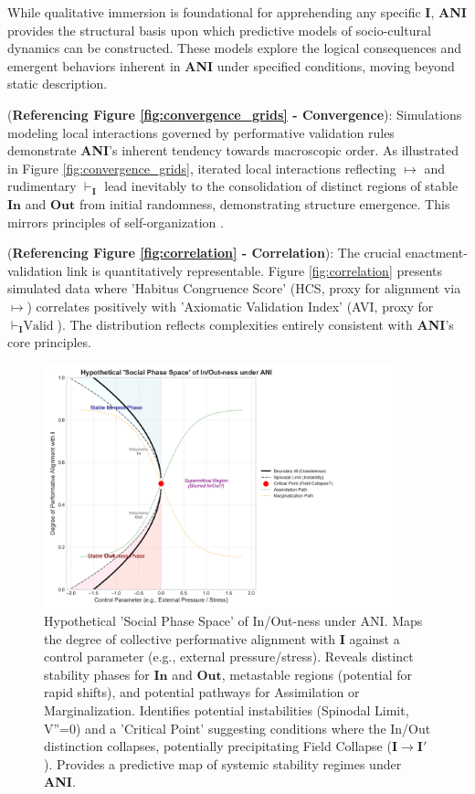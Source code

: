 \documentclass{article}
\newcommand{\ANI}{\textbf{ANI}}             %
\newcommand{\Isness}{\mathbf{I}}            %
\newcommand{\Inness}{\mathbf{In}}           %
\newcommand{\Outness}{\mathbf{Out}}         %
\newcommand{\enactment}{\ensuremath{\mapsto}} %
\newcommand{\validates}[1]{\ensuremath{\vdash_{#1}}} %
\begin{document}
While qualitative immersion \citep{DenzinLincoln2011} is foundational for apprehending any specific $\Isness$, \ANI{} provides the structural basis upon which predictive models of socio-cultural dynamics can be constructed. These models explore the logical consequences and emergent behaviors inherent in \ANI{} under specified conditions, moving beyond static description.

(\textbf{Referencing Figure \ref{fig:convergence_grids} - Convergence}): Simulations modeling local interactions governed by performative validation rules demonstrate \ANI{}'s inherent tendency towards macroscopic order. As illustrated in Figure \ref{fig:convergence_grids}, iterated local interactions reflecting $\enactment$ and rudimentary $\validates{\Isness}$ lead inevitably to the consolidation of distinct regions of stable $\Inness$ and $\Outness$ from initial randomness, demonstrating structure emergence. This mirrors principles of self-organization \citep{Prigogine1984}.

(\textbf{Referencing Figure \ref{fig:correlation} - Correlation}): The crucial enactment-validation link is quantitatively representable. Figure \ref{fig:correlation} presents simulated data where 'Habitus Congruence Score' (HCS, proxy for alignment via $\enactment$) correlates positively with 'Axiomatic Validation Index' (AVI, proxy for $\validates{\Isness} \text{Valid}$). The distribution reflects complexities entirely consistent with \ANI{}'s core principles.

\begin{figure}[h!]
    \centering
    \includegraphics[width=0.9\textwidth]{figures/ani_figure2_phase_inspired.png}
    \caption{Hypothetical 'Social Phase Space' of In/Out-ness under ANI. Maps the degree of collective performative alignment with $\Isness$ against a control parameter (e.g., external pressure/stress). Reveals distinct stability phases for $\Inness$ and $\Outness$, metastable regions (potential for rapid shifts), and potential pathways for Assimilation or Marginalization. Identifies potential instabilities (Spinodal Limit, V''=0) and a 'Critical Point' suggesting conditions where the In/Out distinction collapses, potentially precipitating Field Collapse ($\Isness \rightarrow \Isness'$). Provides a predictive map of systemic stability regimes under \ANI{}.}
    \label{fig:phase_space}
\end{figure}
\end{document}
